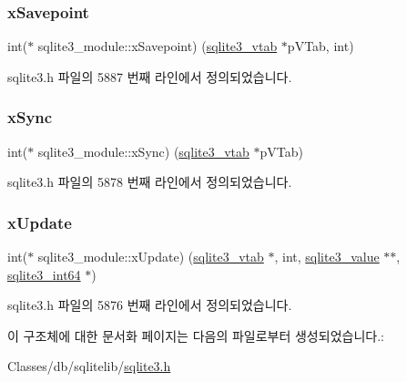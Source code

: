 \subsubsection{\texorpdfstring{x\+Savepoint}{xSavepoint}}
{\footnotesize\ttfamily int($\ast$ sqlite3\+\_\+module\+::x\+Savepoint) (\hyperlink{structsqlite3__vtab}{sqlite3\+\_\+vtab} $\ast$p\+V\+Tab, int)}



sqlite3.\+h 파일의 5887 번째 라인에서 정의되었습니다.

\mbox{\label{structsqlite3__module_a3a2dda4b384eef16bf939e3c25df7282}} 
\subsubsection{\texorpdfstring{x\+Sync}{xSync}}
{\footnotesize\ttfamily int($\ast$ sqlite3\+\_\+module\+::x\+Sync) (\hyperlink{structsqlite3__vtab}{sqlite3\+\_\+vtab} $\ast$p\+V\+Tab)}



sqlite3.\+h 파일의 5878 번째 라인에서 정의되었습니다.

\mbox{\label{structsqlite3__module_aa6c44549a07cc5bf36fae44930069ade}} 
\subsubsection{\texorpdfstring{x\+Update}{xUpdate}}
{\footnotesize\ttfamily int($\ast$ sqlite3\+\_\+module\+::x\+Update) (\hyperlink{structsqlite3__vtab}{sqlite3\+\_\+vtab} $\ast$, int, \hyperlink{sqlite3_8h_ac2fa1ecdb2290d9af6010edbd1cbc83c}{sqlite3\+\_\+value} $\ast$$\ast$, \hyperlink{sqlite3_8h_a0a4d3e6c1ad46f90e746b920ab6ca0d2}{sqlite3\+\_\+int64} $\ast$)}



sqlite3.\+h 파일의 5876 번째 라인에서 정의되었습니다.



이 구조체에 대한 문서화 페이지는 다음의 파일로부터 생성되었습니다.\+:\begin{DoxyCompactItemize}
\item 
Classes/db/sqlitelib/\hyperlink{sqlite3_8h}{sqlite3.\+h}\end{DoxyCompactItemize}
